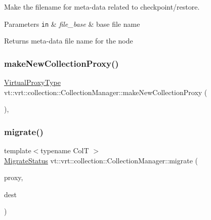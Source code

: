 Make the filename for meta-\/data related to checkpoint/restore. 


\begin{DoxyParams}[1]{Parameters}
\mbox{\tt in}  & {\em file\+\_\+base} & base file name\\
\hline
\end{DoxyParams}
\begin{DoxyReturn}{Returns}
meta-\/data file name for the node 
\end{DoxyReturn}
\mbox{\label{structvt_1_1vrt_1_1collection_1_1_collection_manager_a13988c17d12744b3229d380ccef5ec07}} 
\subsubsection{\texorpdfstring{make\+New\+Collection\+Proxy()}{makeNewCollectionProxy()}}
{\footnotesize\ttfamily \hyperlink{namespacevt_a1b417dd5d684f045bb58a0ede70045ac}{Virtual\+Proxy\+Type} vt\+::vrt\+::collection\+::\+Collection\+Manager\+::make\+New\+Collection\+Proxy (\begin{DoxyParamCaption}{ }\end{DoxyParamCaption})\hspace{0.3cm}{\ttfamily [inline]}, {\ttfamily [protected]}}

\mbox{\label{structvt_1_1vrt_1_1collection_1_1_collection_manager_a195df30bb149ade0000c5c5118b57d87}} 
\subsubsection{\texorpdfstring{migrate()}{migrate()}}
{\footnotesize\ttfamily template$<$typename ColT $>$ \\
\hyperlink{namespacevt_1_1vrt_1_1collection_ad221ad8aea9e586689b4335f5bcd9804}{Migrate\+Status} vt\+::vrt\+::collection\+::\+Collection\+Manager\+::migrate (\begin{DoxyParamCaption}\item[{\hyperlink{structvt_1_1vrt_1_1collection_1_1_vrt_elm_proxy}{Vrt\+Elm\+Proxy}$<$ ColT, typename Col\+T\+::\+Index\+Type $>$}]{proxy,  }\item[{\hyperlink{namespacevt_a866da9d0efc19c0a1ce79e9e492f47e2}{Node\+Type} const \&}]{dest }\end{DoxyParamCaption})}

